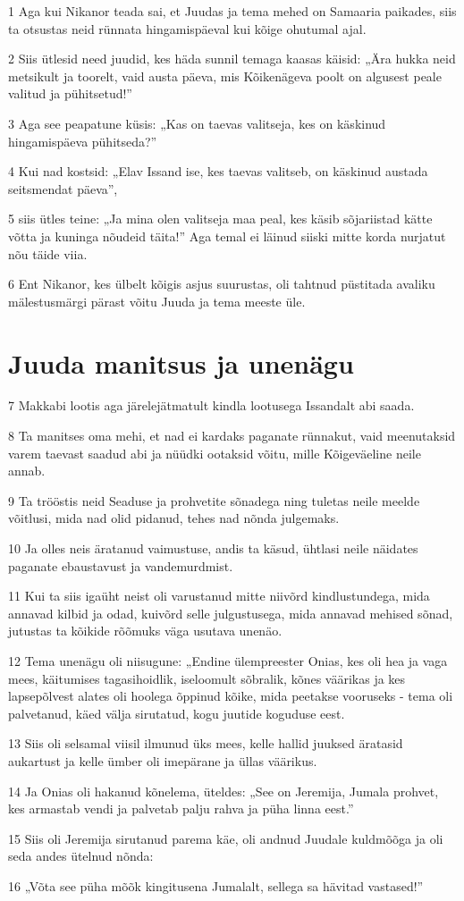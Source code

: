 \par 1 Aga kui Nikanor teada sai, et Juudas ja tema mehed on Samaaria paikades, siis ta otsustas neid rünnata hingamispäeval kui kõige ohutumal ajal.
\par 2 Siis ütlesid need juudid, kes häda sunnil temaga kaasas käisid: „Ära hukka neid metsikult ja toorelt, vaid austa päeva, mis Kõikenägeva poolt on algusest peale valitud ja pühitsetud!”
\par 3 Aga see peapatune küsis: „Kas on taevas valitseja, kes on käskinud hingamispäeva pühitseda?”
\par 4 Kui nad kostsid: „Elav Issand ise, kes taevas valitseb, on käskinud austada seitsmendat päeva”,
\par 5 siis ütles teine: „Ja mina olen valitseja maa peal, kes käsib sõjariistad kätte võtta ja kuninga nõudeid täita!” Aga temal ei läinud siiski mitte korda nurjatut nõu täide viia.
\par 6 Ent Nikanor, kes ülbelt kõigis asjus suurustas, oli tahtnud püstitada avaliku mälestusmärgi pärast võitu Juuda ja tema meeste üle.


\section*{Juuda manitsus ja unenägu}

\par 7 Makkabi lootis aga järelejätmatult kindla lootusega Issandalt abi saada.
\par 8 Ta manitses oma mehi, et nad ei kardaks paganate rünnakut, vaid meenutaksid varem taevast saadud abi ja nüüdki ootaksid võitu, mille Kõigeväeline neile annab.
\par 9 Ta trööstis neid Seaduse ja prohvetite sõnadega ning tuletas neile meelde võitlusi, mida nad olid pidanud, tehes nad nõnda julgemaks.
\par 10 Ja olles neis äratanud vaimustuse, andis ta käsud, ühtlasi neile näidates paganate ebaustavust ja vandemurdmist.
\par 11 Kui ta siis igaüht neist oli varustanud mitte niivõrd kindlustundega, mida annavad kilbid ja odad, kuivõrd selle julgustusega, mida annavad mehised sõnad, jutustas ta kõikide rõõmuks väga usutava unenäo.
\par 12 Tema unenägu oli niisugune: „Endine ülempreester Onias, kes oli hea ja vaga mees, käitumises tagasihoidlik, iseloomult sõbralik, kõnes väärikas ja kes lapsepõlvest alates oli hoolega õppinud kõike, mida peetakse vooruseks - tema oli palvetanud, käed välja sirutatud, kogu juutide koguduse eest.
\par 13 Siis oli selsamal viisil ilmunud üks mees, kelle hallid juuksed äratasid aukartust ja kelle ümber oli imepärane ja üllas väärikus.
\par 14 Ja Onias oli hakanud kõnelema, üteldes: „See on Jeremija, Jumala prohvet, kes armastab vendi ja palvetab palju rahva ja püha linna eest.”
\par 15 Siis oli Jeremija sirutanud parema käe, oli andnud Juudale kuldmõõga ja oli seda andes ütelnud nõnda:
\par 16 „Võta see püha mõõk kingitusena Jumalalt, sellega sa hävitad vastased!”


